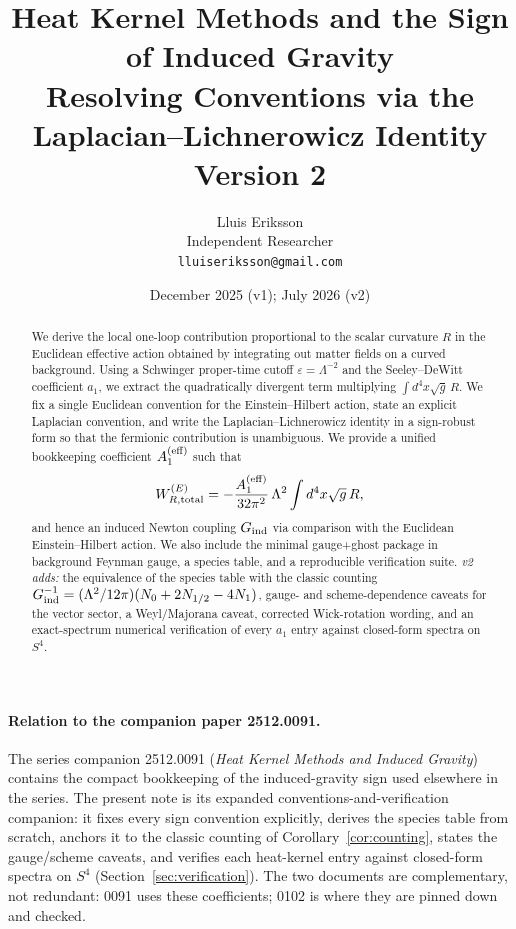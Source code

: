 \documentclass[11pt]{article}
\title{Heat Kernel Methods and the Sign of Induced Gravity\\
{\large Resolving Conventions via the Laplacian--Lichnerowicz Identity}\\
{\normalsize Version 2}}
\author{Lluis Eriksson\\ Independent Researcher\\ \texttt{lluiseriksson@gmail.com}}
\date{December 2025 (v1); July 2026 (v2)}
\begin{document}
\maketitle

\begin{abstract}
We derive the local one-loop contribution proportional to the scalar curvature
$R$ in the Euclidean effective action obtained by integrating out matter
fields on a curved background. Using a Schwinger proper-time cutoff
$\varepsilon = \Lambda^{-2}$ and the Seeley--DeWitt coefficient $a_1$, we
extract the quadratically divergent term multiplying $\int d^4x \sqrt{g}\, R$.
We fix a single Euclidean convention for the Einstein--Hilbert action, state
an explicit Laplacian convention, and write the Laplacian--Lichnerowicz
identity in a sign-robust form so that the fermionic contribution is
unambiguous. We provide a unified bookkeeping coefficient $A_1^{\rm (eff)}$
such that
\[
W^{(E)}_{R,\rm total} = -\frac{A_1^{\rm (eff)}}{32\pi^2}\,\Lambda^2
\int d^4x \sqrt{g}\, R,
\]
and hence an induced Newton coupling $G_{\rm ind}$ via comparison with the
Euclidean Einstein--Hilbert action. We also include the minimal gauge+ghost
package in background Feynman gauge, a species table, and a reproducible
verification suite. \emph{v2 adds:} the equivalence of the species table with
the classic counting $G_{\rm ind}^{-1} = (\Lambda^2/12\pi)(N_0 + 2N_{1/2} -
4N_1)$, gauge- and scheme-dependence caveats for the vector sector, a
Weyl/Majorana caveat, corrected Wick-rotation wording, and an exact-spectrum numerical
verification of every $a_1$ entry against closed-form spectra on $S^4$.
\end{abstract}

\tableofcontents

\paragraph{Relation to the companion paper 2512.0091.}
The series companion 2512.0091 (\emph{Heat Kernel Methods and Induced
Gravity}) contains the compact bookkeeping of the induced-gravity sign
used elsewhere in the series. The present note is its expanded
conventions-and-verification companion: it fixes every sign convention
explicitly, derives the species table from scratch, anchors it to the
classic counting of Corollary~\ref{cor:counting}, states the gauge/scheme
caveats, and verifies each heat-kernel entry against closed-form spectra
on $S^4$ (Section~\ref{sec:verification}). The two documents are
complementary, not redundant: 0091 uses these coefficients; 0102 is where
they are pinned down and checked.
\end{document}
